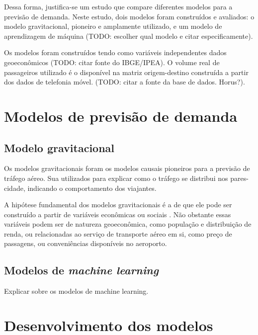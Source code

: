 \documentclass[12pt]{article}
\begin{document}
Dessa forma, justifica-se um estudo que compare diferentes modelos para
a previsão de demanda. Neste estudo, dois modelos foram construídos e
avaliados: o modelo gravitacional, pioneiro e amplamente utilizado, e um
modelo de aprendizagem de máquina (TODO: escolher qual modelo e citar
especificamente).

Os modelos foram construídos tendo como variáveis independentes dados
geoeconômicos (TODO: citar fonte do IBGE/IPEA). O volume real de
passageiros utilizado é o disponível na matriz origem-destino construída
a partir dos dados de telefonia móvel. (TODO: citar a fonte da base de
dados. Horus?).

\hypertarget{modelos-de-previsuxe3o-de-demanda}{%
\section{Modelos de previsão de
demanda}\label{modelos-de-previsuxe3o-de-demanda}}

\hypertarget{modelo-gravitacional}{%
\subsection{Modelo gravitacional}\label{modelo-gravitacional}}

Os modelos gravitacionais foram os modelos causais pioneiros para a
previsão de tráfego aéreo. Sua utilizados para explicar como o tráfego
se distribui nos pares-cidade, indicando o comportamento dos viajantes.

A hipótese fundamental dos modelos gravitacionais é a de que ele pode
ser construído a partir de variáveis econômicas ou sociais
\citep{Grosche2007}. Não obstante essas variáveis podem ser de natureza
geoeconômica, como população e distribuição de renda, ou relacionadas ao
serviço de transporte aéreo em si, como preço de passagens, ou
conveniências disponíveis no aeroporto.

\hypertarget{modelos-de-machine-learning}{%
\subsection{\texorpdfstring{Modelos de \emph{machine
learning}}{Modelos de machine learning}}\label{modelos-de-machine-learning}}

Explicar sobre os modelos de machine learning.

\hypertarget{desenvolvimento-dos-modelos}{%
\section{Desenvolvimento dos
modelos}\label{desenvolvimento-dos-modelos}}
\end{document}
